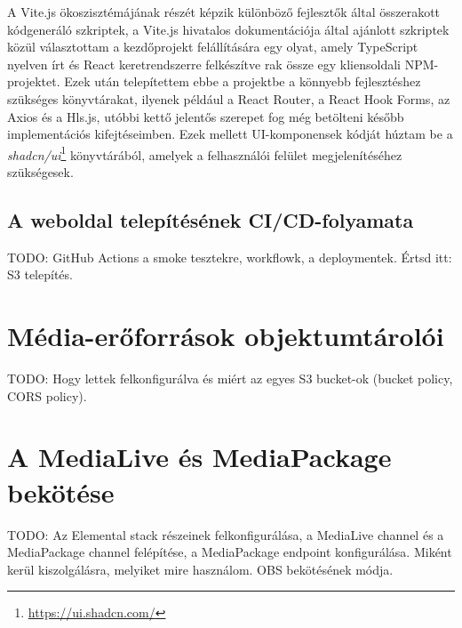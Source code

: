 A Vite.js ökoszisztémájának részét képzik különböző fejlesztők által összerakott kódgeneráló szkriptek, a Vite.js hivatalos dokumentációja által ajánlott szkriptek közül választottam a kezdőprojekt felállítására egy olyat, amely TypeScript nyelven írt és React keretrendszerre felkészítve rak össze egy kliensoldali NPM-projektet. Ezek után telepítettem ebbe a projektbe a könnyebb fejlesztéshez szükséges könyvtárakat, ilyenek például a React Router, a React Hook Forms, az Axios és a Hls.js, utóbbi kettő jelentős szerepet fog még betölteni később implementációs kifejtéseimben. Ezek mellett UI-komponensek kódját húztam be a \emph{shadcn/ui}\footnote{\url{https://ui.shadcn.com/}} könyvtárából, amelyek a felhasználói felület megjelenítéséhez szükségesek.

\subsection{A weboldal telepítésének CI/CD-folyamata}

TODO: GitHub Actions a smoke tesztekre, workflowk, a deploymentek. Értsd itt: S3 telepítés.

\section{Média-erőforrások objektumtárolói}

TODO: Hogy lettek felkonfigurálva és miért az egyes S3 bucket-ok (bucket policy, CORS policy).

\section{A MediaLive és MediaPackage bekötése}

TODO: Az Elemental stack részeinek felkonfigurálása, a MediaLive channel és a MediaPackage channel felépítése, a MediaPackage endpoint konfigurálása. Miként kerül kiszolgálásra, melyiket mire használom. OBS bekötésének módja.
